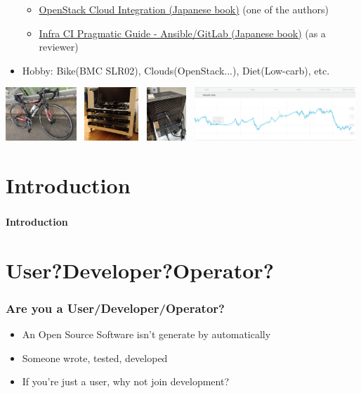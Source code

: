 \documentclass[aspectratio=169,11pt,hyperref={colorlinks=true}]{beamer}
\begin{document}
\begin{frame}
\begin{itemize}
      \begin{itemize}
      \item \href{https://www.amazon.co.jp/dp/4798139785/}{\scriptsize{OpenStack
        Cloud Integration (Japanese book)}} (one of the authors)
      \item \href{https://www.amazon.co.jp/dp/4798155128/}{\scriptsize{Infra CI
        Pragmatic Guide - Ansible/GitLab (Japanese book)}} (as a reviewer)
      \end{itemize}
    \item Hobby: Bike(BMC SLR02), Clouds(OpenStack...), Diet(Low-carb), etc.
  \end{itemize}
  \includegraphics[height=20mm]{images/my-bike.jpg}~
  \includegraphics[height=20mm]{images/server_front.jpg}~
  \includegraphics[height=20mm]{images/my-small-server.jpg}~
  \includegraphics[height=20mm]{images/my-weight.png}
\end{frame}

\section{Introduction}
\begin{frame}
  \frametitle{ }
  \Huge{\bf{Introduction}}
\end{frame}

\section{User?Developer?Operator?}
\begin{frame}
  \frametitle{Are you a User/Developer/Operator?}
  \begin{itemize}
    \item An Open Source Software isn't generate by automatically
    \item Someone wrote, tested, developed
    \item If you're just a user, why not join development?
  \end{itemize}
\end{frame}
\end{document}
